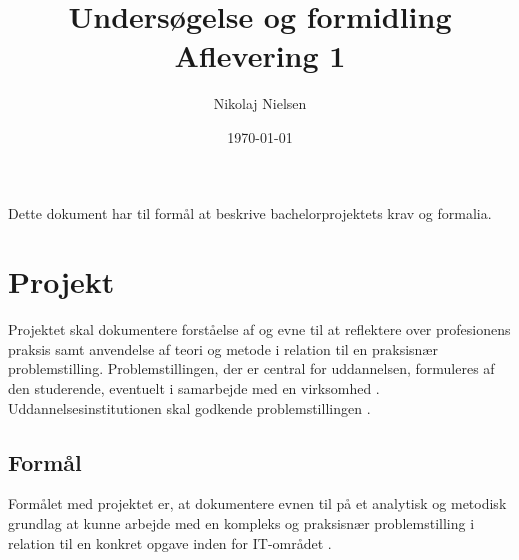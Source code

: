 \documentclass[a4paper]{article}
\title{\textbf{Undersøgelse og formidling}\\ Aflevering 1}
\author{Nikolaj Nielsen}
\date{\today}
\begin{document}
\maketitle
\tableofcontents

\section*{}
Dette dokument har til formål at beskrive bachelorprojektets krav og formalia.

\section{Projekt}
Projektet skal dokumentere forståelse af og evne til at reflektere over profesionens praksis samt anvendelse af teori og metode i relation til en praksisnær problemstilling. Problemstillingen, der er central for uddannelsen, formuleres af den studerende, eventuelt i samarbejde med en virksomhed \cite[§ 16, stk. 2, nr. 3]{professionsbachelor}. Uddannelsesinstitutionen skal godkende problemstillingen \cite[sektion 5.4]{studieordning}.

\subsection{Formål}
Formålet med projektet er, at dokumentere evnen til på et analytisk og metodisk grundlag at kunne arbejde med en kompleks og praksisnær problemstilling i relation til en konkret opgave inden for IT-området \cite[sektion 5.4]{studieordning}.
\end{document}
